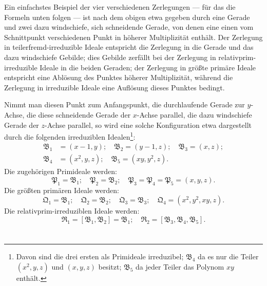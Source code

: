 \documentclass[fontsize=10pt,paper=a5,pagesize,headings=small]{scrbook}
\newcommand{\ideal}[1]{\mathfrak{#1}}
\theoremstyle{plain}
\begin{document}
Ein einfachstes Beispiel der vier verschiedenen Zerlegungen --- für das
die Formeln unten folgen --- ist nach dem obigen etwa gegeben durch eine
Gerade und zwei dazu windschiefe, sich schneidende Gerade, von denen eine
einen vom Schnittpunkt verschiedenen Punkt in höherer Multiplizität enthält.
Der Zerlegung in teilerfremd-irreduzible Ideale entspricht die Zerlegung in
die Gerade und das dazu windschiefe Gebilde; dies Gebilde zerfällt bei der
Zerlegung in relativprim-irreduzible Ideale in die beiden Geraden; der
Zerlegung in größte primäre Ideale entspricht eine Ablösung des Punktes
höherer Multiplizität, während die Zerlegung in irreduzible Ideale eine
Auflösung dieses Punktes bedingt.

Nimmt man diesen Punkt zum Anfangspunkt, die durchlaufende Gerade zur
$y$-Achse, die diese schneidende Gerade der $x$-Achse parallel, die dazu
windschiefe Gerade der $z$-Achse parallel, so wird eine solche Konfiguration
etwa dargestellt durch die folgenden irreduziblen Idealen\footnote{Davon sind
die drei ersten als Primideale irreduzibel; $\ideal{B}_4$ da es nur die Teiler
$(x^2,y,z)$ und $(x,y,z)$ besitzt; $\ideal{B}_5$ da jeder Teiler das Polynom
$xy$ enthält.}:
\begin{align*}
\ideal{B}_1 &= (x-1, y);\quad \ideal{B}_2 = (y-1, z);\quad \ideal{B}_3 = (x, z);\\
\ideal{B}_4 &= (x^2, y, z);\quad \ideal{B}_5 = (xy, y^2, z).
\end{align*}
Die zugehörigen Primideale werden:
\[ \ideal{P}_1 = \ideal{B}_1;\quad \ideal{P}_2 = \ideal{B}_2;\quad \ideal{P}_3 = \ideal{P}_4 = \ideal{P}_5 = (x, y, z). \]
Die größten primären Ideale werden:
\[ \ideal{Q}_1 = \ideal{B}_1;\quad \ideal{Q}_2 = \ideal{B}_2;\quad \ideal{Q}_3 = \ideal{B}_3;
\quad \ideal{Q}_4 = (x^2, y^2, xy, z). \]
Die relativprim-irreduziblen Ideale werden:
\[ \ideal{R}_1 = [\ideal{B}_1, \ideal{B}_2] = \ideal{B}_1;\quad \ideal{R}_2 = [\ideal{B}_3, \ideal{B}_4, \ideal{B}_5]. \]

\setcounter{page}{404}
\section*{}
\end{document}
